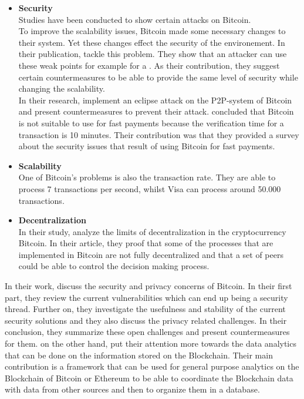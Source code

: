 \begin{itemize}[noitemsep,align=left]
	\item \textbf{Security}\\ Studies \cite{2015_Gervais,2015_Heilman, 2012_Karame} have been conducted to show certain attacks on Bitcoin.\\ To improve the scalability issues, Bitcoin made some necessary changes to their system. Yet these changes effect the security of the environement. In their publication, \citet{2015_Gervais} tackle this problem. They show that an attacker can use these weak points for example for a . As their contribution, they suggest certain countermeasures to be able to provide the same level of security while changing the scalability. \\ In their research, \citet{2015_Heilman} implement an eclipse attack on the P2P-system of Bitcoin and present countermeasures to prevent their attack.
	\citet{2012_Karame} concluded that Bitcoin is not suitable to use for fast payments because the verification time for a transaction is 10 minutes. Their contribution was that they provided a survey about the security issues that result of using Bitcoin for fast payments.
	\item \textbf{Scalability} \\ One of Bitcoin's problems is also the transaction rate. They are able to process 7 transactions per second, whilst Visa can process around 50.000 transactions.
	\item \textbf{Decentralization} \\ In their study, \citet{2014_Gervais} analyze the limits of decentralization in the cryptocurrency Bitcoin. In their article, they proof that some of the processes that are implemented in Bitcoin are not fully decentralized and that a set of peers could be able to control the decision making process.
\end{itemize}
In their work, \citet{2018_Conti} discuss the security and privacy  concerns of Bitcoin. In their first part, they review the current vulnerabilities which can end up being a security thread. Further on, they investigate the usefulness and stability of the current security solutions and they also discuss the privacy related challenges. In their conclusion, they summarize these open challenges and present countermeasures for them.
\citet{2017_Bartoletti} on the other hand, put their attention more towards the data analytics that can be done on the information stored on the Blockchain. Their main contribution is a framework that can be used for general purpose analytics on the Blockchain of Bitcoin or Ethereum to be able to coordinate the Blockchain data with data from other sources and then to organize them in a database.
